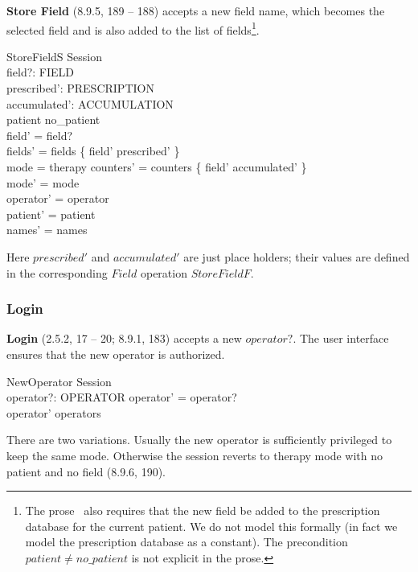 {\bf Store Field} (8.9.5, 189 -- 188) accepts a new field name, which
becomes the selected field and is also added to the list of
fields\footnote{The prose~\cite{jacky92} also requires that the new
field be added to the prescription database for the current patient.
We do not model this formally (in fact we model the prescription
database as a constant).  The precondition $patient \neq no\_patient$
is not explicit in the prose.}.

\begin{schema}{StoreFieldS}
	\Delta Session \\
	field?: FIELD \\
	prescribed': PRESCRIPTION \\
	accumulated': ACCUMULATION \\
\where
	patient \neq no\_patient \\
	field' = field? \\
	fields' = fields \cup \{ field' \mapsto prescribed' \} \\
	mode = therapy \implies counters' = counters \cup \{ field' \mapsto accumulated' \} \\
\also
	mode' = mode \\
	operator' = operator \\
	patient' = patient \\
	names' = names \\
\end{schema}
Here $prescribed'$ and $accumulated'$ are just place holders; their
values are defined in the corresponding $Field$ operation
$StoreFieldF$.

\subsubsection{Login} \label{sect:login-session}

{\bf Login} (2.5.2, 17 -- 20; 8.9.1, 183) accepts a new $operator?$.
The user interface ensures that the new operator is authorized.

\begin{schema}{NewOperator}
	\Delta Session \\
	operator?: OPERATOR
\where
	operator' = operator? \\
	operator' \in operators
\end{schema}
There are two variations.  Usually the new operator is sufficiently
privileged to keep the same mode.  Otherwise the session reverts to
therapy mode with no patient and no field (8.9.6, 190).

